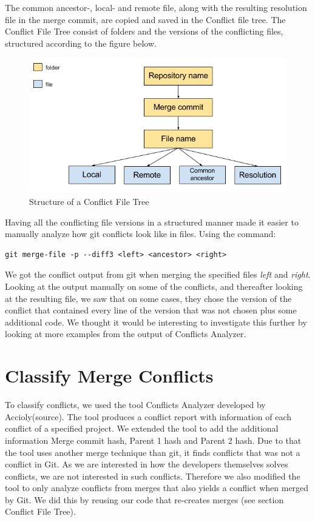 The common ancestor-, local- and remote file, along with the resulting resolution file in the merge commit, are copied and saved in the Conflict file tree. The Conflict File Tree consist of folders and the versions of the conflicting files, structured according to the figure below.\\
\begin{figure}[H]
\centering
\includegraphics[width=400pt]{figure/conflicts.png}
\caption{Structure of a Conflict File Tree}
\end{figure}

Having all the conflicting file versions in a structured manner made it easier to manually analyze how git conflicts look like in files. Using the command:
\lstset{language=Bash,numbers=left,xleftmargin=2em,frame=single,framexleftmargin=1.5em}
\begin{lstlisting}[frame=single]
git merge-file -p --diff3 <left> <ancestor> <right>
\end{lstlisting}
We got the conflict output from git when merging the specified files \textit{left} and \textit{right}. Looking at the output manually on some of the conflicts, and thereafter looking at the resulting file, we saw that on some cases, they chose the version of the conflict that contained every line of the version that was not chosen plus some additional code. We thought it would be interesting to investigate this further by looking at more examples from the output of Conflicts Analyzer.

\section{Classify Merge Conflicts}
To classify conflicts, we used the tool Conflicts Analyzer developed by Accioly(source). The tool produces a conflict report with information of each conflict of a specified project. We extended the tool to add the additional information Merge commit hash, Parent 1 hash and Parent 2 hash. Due to that the tool uses another merge technique than git, it finds conflicts that was not a conflict in Git. As we are interested in how the developers themselves solves conflicts, we are not interested in such conflicts. Therefore we also modified the tool to only analyze conflicts from merges that also yields a conflict when merged by Git. We did this by reusing our code that re-creates merges (see section Conflict File Tree).


